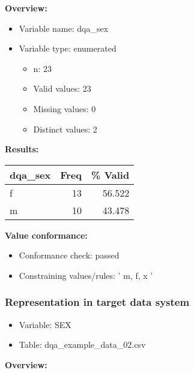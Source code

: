 \documentclass[
]{article}
\providecommand{\tightlist}{%
  \setlength{\itemsep}{0pt}\setlength{\parskip}{0pt}}
\begin{document}
\textbf{Overview:}

\begin{itemize}
\tightlist
\item
  Variable name: dqa\_sex
\item
  Variable type: enumerated

  \begin{itemize}
  \tightlist
  \item
    n: 23
  \item
    Valid values: 23
  \item
    Missing values: 0
  \item
    Distinct values: 2
  \end{itemize}
\end{itemize}

\textbf{Results:}\\

\begin{table}[H]
\centering
\begin{tabular}{l|r|r}
\hline
\textbf{dqa\_sex} & \textbf{Freq} & \textbf{\% Valid}\\
\hline
f & 13 & 56.522\\
\hline
m & 10 & 43.478\\
\hline
\end{tabular}
\end{table}

\textbf{Value conformance:}

\begin{itemize}
\tightlist
\item
  Conformance check: passed
\item
  Constraining values/rules: ' m, f, x '
\end{itemize}

\newpage

\hypertarget{representation-in-target-data-system-11}{%
\subsubsection{\texorpdfstring{Representation in \textbf{target} data
system}{Representation in target data system}}\label{representation-in-target-data-system-11}}

\begin{itemize}
\tightlist
\item
  Variable: SEX
\item
  Table: dqa\_example\_data\_02.csv
\end{itemize}

\textbf{Overview:}
\end{document}
